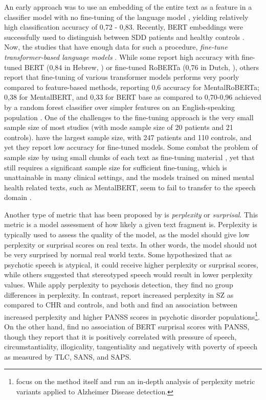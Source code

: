 An early approach was to use an embedding of the entire text as a feature in a classifier model with no fine-tuning of the language model \citep{elvevaag2010automated, rosenstein2015language}, yielding relatively high classification accuracy of 0,72 - 0,83. Recently, BERT embeddings were successfully used to distinguish between SDD patients and healthy controls \citep{srivastava2022p473}. Now, the studies that have enough data for such a procedure, \textit{fine-tune transformer-based language models} \citep{wouts2021belabbert, aich2022towards, shriki2022masking}. While some report high accuracy with fine-tuned BERT (0,84 in Hebrew, \cite{shriki2022masking}) or fine-tuned RoBERTa (0,76 in Dutch, \cite{wouts2021belabbert}), others report that fine-tuning of various transformer models performs very poorly compared to feature-based methods, reporting 0,6 accuracy for MentalRoBERTa; 0,38 for MentalBERT, and 0,33 for BERT base as compared to 0,70-0,96 achieved by a random forest classifier over simpler features on an English-speaking population \citep{aich2022towards}. One of the challenges to the fine-tuning approach is the very small sample size of most studies (with mode sample size of 20 patients and 21 controls). \citet{aich2022towards} have the largest sample size, with 247 patients and 110 controls, and yet they report low accuracy for fine-tuned models. Some combat the problem of sample size by using small chunks of each text as fine-tuning material \citep{wouts2021belabbert}, yet that still requires a significant sample size for sufficient fine-tuning, which is unattainable in many clinical settings, and the models trained on mined mental health related texts, such as MentalBERT, seem to fail to transfer to the speech domain \citep{aich2022towards}.

Another type of metric that has been proposed by \citet{mitchell2015quantifying} is \textit{perplexity} or \textit{surprisal}. This metric is a model assessment of how likely a given text fragment is. Perplexity is typically used to assess the quality of the model, as the model should give low perplexity or surprisal scores on real texts. In other words, the model should not be very surprised by normal real world texts. Some hypothesized that as psychotic speech is atypical, it could receive higher perplexity or surprisal scores, while others suggested that stereotyped speech would result in lower perplexity values. While \citet{mitchell2015quantifying} apply perplexity to psychosis detection, they find no group differences in perplexity. In contrast, \citet{srivastava2022increased} report increased perplexity in SZ as compared to CHR and controls, and both \citet{vail2018toward} and \citet{girard2022computational} find an association between increased perplexity and higher PANSS scores in psychotic disorder populations\footnote{\citet{colla2022semantic} focus on the method itself and run an in-depth analysis of perplexity metric variants applied to Alzheimer Disease detection.}. On the other hand, \citet{jeong2023exploring} find no association of BERT surprisal scores with PANSS, though they report that it is positively correlated with pressure of speech, circumstantiality, illogicality, tangentiality and negatively with poverty of speech as measured by TLC, SANS, and SAPS.


